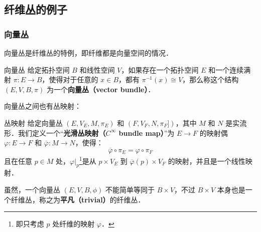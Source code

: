 \subsection{纤维丛的例子}

\subsubsection{向量丛}
向量丛是纤维丛的特例，即纤维都是向量空间的情况．

\begin{definition}{向量丛}
给定拓扑空间 $B$ 和线性空间 $V$，如果存在一个拓扑空间 $E$ 和一个连续满射 $\pi:E\rightarrow B$，使得对于任意的 $x\in B$，都有 $\pi^{-1}(x)\cong V$，那么称这个结构 $(E, V, B, \pi)$ 为一个\textbf{向量丛（vector bundle）}．
\end{definition}

向量丛之间也有丛映射：

\begin{definition}{丛映射}
给定向量丛 $(E, V_E, M, \pi_E)$ 和 $(F, V_F, N, \pi_F])$，其中 $M$ 和 $N$ 是实流形．我们定义一个“\textbf{光滑丛映射（$C^\infty$ bundle map）}”为 $E\rightarrow F$ 的映射偶 $\varphi: E\rightarrow F$ 和 $\overline{\varphi}: M\rightarrow N$，使得：
\begin{equation}
\overline{\varphi}\circ\pi_E=\varphi\circ\pi_F
\end{equation}
且在任意 $p\in M$ 处，$\varphi|_p$\footnote{即只考虑 $p$ 处纤维的映射 $\varphi$．}是从 $p\times V_E$ 到 $\overline{\varphi}(p)\times V_F$ 的映射，并且是一个线性映射．
\end{definition}

虽然，一个向量丛 $(E, V, B, \phi)$ 不能简单等同于 $B\times V$，不过 $B\times V$ 本身也是一个纤维丛，称之为\textbf{平凡（trivial）}的纤维丛．




